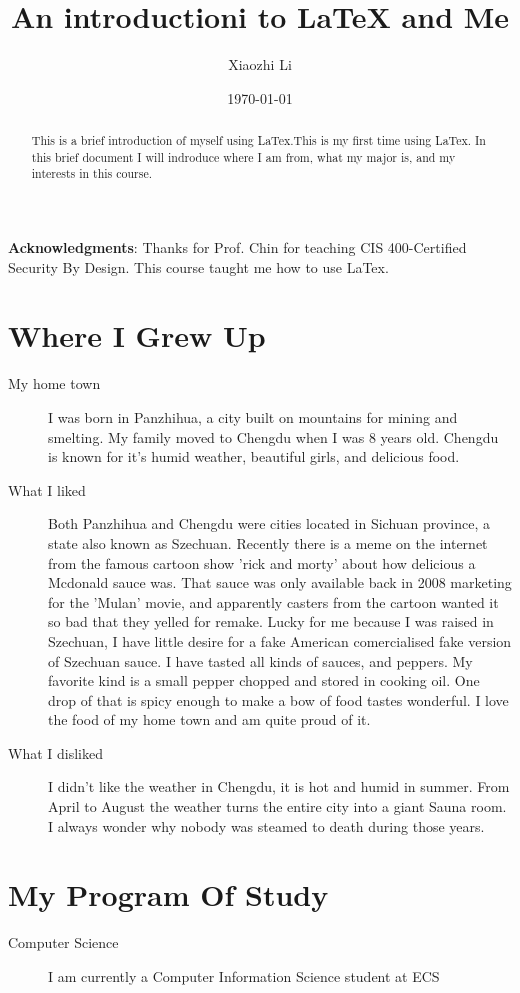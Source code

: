 \documentclass{article}
\title{An introductioni to LaTeX and Me}
\author{Xiaozhi Li}
\date{\today}
\begin{document}
\maketitle{}

\begin{abstract}
  This is a brief introduction of myself using LaTex.This is my first
  time using LaTex. In this brief document I will indroduce where I am
  from, what my major is, and my interests in this course.
\end{abstract}
\textbf{Acknowledgments}: Thanks for Prof. Chin for teaching CIS
400-Certified Security By Design. This course taught me how to use
LaTex.

\section{Where I Grew Up}
\label{sec:where-i-grew}
\begin{description}
\item[My home town] I was born in Panzhihua, a city built on mountains
  for mining and smelting. My family moved to Chengdu when I was 8
  years old. Chengdu is known for it's humid weather, beautiful girls,
  and delicious food.
\item[What I liked] Both Panzhihua and Chengdu were cities located in
  Sichuan province, a state also known as Szechuan. Recently there is
  a meme on the internet from the famous cartoon show 'rick and morty'
  about how delicious a Mcdonald sauce was. That sauce was only
  available back in 2008 marketing for the 'Mulan' movie, and
  apparently casters from the cartoon wanted it so bad that they
  yelled for remake. Lucky for me because I was raised in Szechuan, I
  have little desire for a fake American comercialised fake version of
  Szechuan sauce. I have tasted all kinds of sauces, and peppers. My
  favorite kind is a small pepper chopped and stored in cooking
  oil. One drop of that is spicy enough to make a bow of food tastes
  wonderful. I love the food of my home town and am quite proud of it.
\item[What I disliked] I didn't like the weather in Chengdu, it is hot
  and humid in summer. From April to August the weather turns the
  entire city into a giant Sauna room. I always wonder why nobody was
  steamed to death during those years.

\end{description}
\section{My Program Of Study}
\label{sec:my-program-study}
\begin{description}
\item[Computer Science] I am currently a Computer Information Science
  student at ECS
\end{description}
\end{document}
